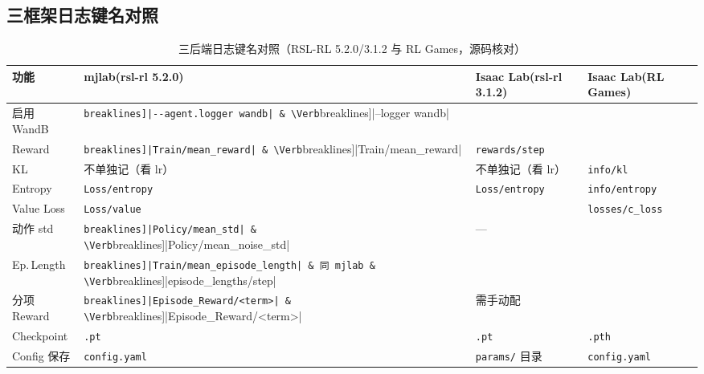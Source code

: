 \subsection{三框架日志键名对照}

\begin{table}[H]
\centering
\caption{三后端日志键名对照（RSL-RL 5.2.0/3.1.2 与 RL Games，源码核对）}
\label{tab:rlmc-diag-logmap}
\begin{tabular}{p{2.6cm}p{3.1cm}p{3.1cm}p{2.6cm}}
\hline
功能 & mjlab(rsl-rl 5.2.0) & Isaac Lab(rsl-rl 3.1.2) & Isaac Lab(RL Games) \\
\hline
启用 WandB & \Verb[breaklines]|--agent.logger wandb| & \Verb[breaklines]|--logger wandb| & \Verb[breaklines]|--logger wandb| \\
Reward & \Verb[breaklines]|Train/mean_reward| & \Verb[breaklines]|Train/mean_reward| & \verb|rewards/step| \\
KL & 不单独记（看 lr） & 不单独记（看 lr） & \verb|info/kl| \\
Entropy & \verb|Loss/entropy| & \verb|Loss/entropy| & \verb|info/entropy| \\
Value Loss & \verb|Loss/value| & \Verb[breaklines]|Loss/value_function| & \verb|losses/c_loss| \\
动作 std & \Verb[breaklines]|Policy/mean_std| & \Verb[breaklines]|Policy/mean_noise_std| & — \\
Ep.\,Length & \Verb[breaklines]|Train/mean_episode_length| & 同 mjlab & \Verb[breaklines]|episode_lengths/step| \\
分项 Reward & \Verb[breaklines]|Episode_Reward/<term>| & \Verb[breaklines]|Episode_Reward/<term>| & 需手动配 \\
Checkpoint & \verb|.pt| & \verb|.pt| & \verb|.pth| \\
Config 保存 & \verb|config.yaml| & \verb|params/| 目录 & \verb|config.yaml| \\
\hline
\end{tabular}
\end{table}


